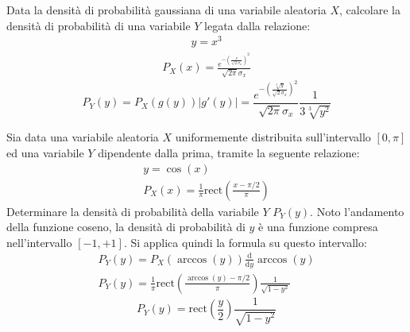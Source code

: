 \documentclass{article}
\newcommand{\rect}{\mathrm{rect}}
\newcommand{\df}{\mathrm{d}}
\begin{document}
Data la densità di probabilità gaussiana di una variabile aleatoria $X$, calcolare la densità di probabilità di una variabile $Y$ legata dalla relazione:
\begin{gather*}
    y=x^3
\end{gather*}
\begin{gather*}
    P_X(x)=\displaystyle\frac{e^{-\left(\frac{x}{\sqrt{2}{\sigma_x}}\right)^2}}{\sqrt{2\pi}\sigma_x}
\end{gather*}
\begin{equation}
    P_Y(y)=P_X(g(y))|g'(y)|=\displaystyle\frac{e^{-\left(\frac{\sqrt[3]{y}}{\sqrt{2}{\sigma_x}}\right)^2}}{\sqrt{2\pi}\sigma_x}\frac{1}{3\sqrt[3]{y^2}}
\end{equation}



Sia data una variabile aleatoria $X$ uniformemente distribuita sull'intervallo $[0,\pi]$ ed una variabile $Y$ dipendente dalla prima, tramite la seguente relazione:
\begin{gather*}
    y=\cos(x)\\
    P_X(x)=\displaystyle\frac{1}{\pi}\rect\left(\frac{x-\pi/2}{\pi}\right)
\end{gather*}
Determinare la densità di probabilità della variabile $Y$ $P_Y(y)$. Noto l'andamento della funzione coseno, la densità di probabilità di $y$ è una funzione 
compresa nell'intervallo $[-1,+1]$. Si applica quindi la formula su questo intervallo:
\begin{gather*}
    P_Y(y)=P_X(\arccos(y))\displaystyle\frac{\df}{\df y}\arccos(y)\\
    P_Y(y)=\displaystyle\frac{1}{\pi}\rect\left(\frac{\arccos(y)-\pi/2}{\pi}\right)\frac{1}{\sqrt{1-y^2}}
\end{gather*}
\begin{equation}
    P_Y(y)=\displaystyle\rect\left(\frac{y}{2}\right)\frac{1}{\sqrt{1-y^2}}
\end{equation}
\end{document}
